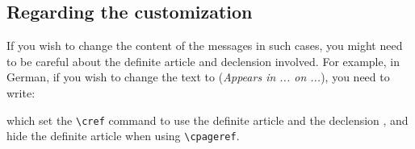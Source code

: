 \documentclass[
    title in boldface,
    emphasize theorems,
    simple name, %
    name in link,
]{einfart}
\begin{document}

\subsection{Regarding the customization}

If you wish to change the content of the messages in such cases, you might need to be careful about the definite article and declension involved. For example, in German, if you wish to change the text to  (\emph{Appears in ... on ...}), you need to write:
\begin{code}
\SetForwardReferenceRefForm{\crefthe[in,dat.]}
\SetForwardReferencePagerefForm{\cpagerefthe[noun]}
\end{code}
which set the \lstinline|\cref| command to use the definite article  and the declension , and hide the definite article when using \lstinline|\cpageref|.
\end{document}
